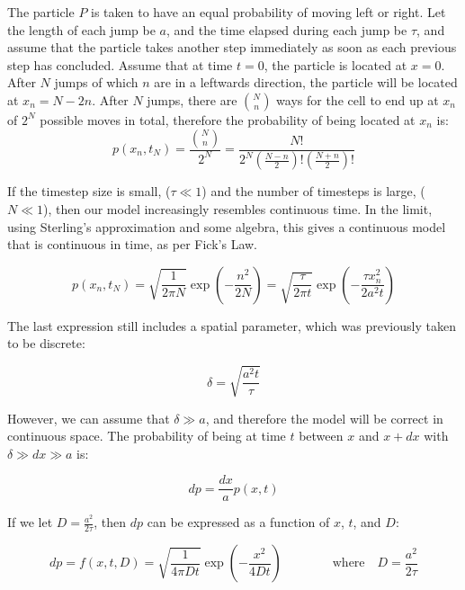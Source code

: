 \documentclass[12pt]{article}
\begin{document}
The particle \(P\) is taken to have an equal probability of 
moving left or right. Let the length of each jump be \(a\), and 
the time elapsed during each jump be \(\tau\), and assume that 
the particle takes another step immediately as soon as each previous 
step has concluded. Assume that at time 
\(t=0\), the particle is located at \(x=0\). After \(N\) jumps of which \(n\) are in a 
leftwards direction, the particle will be located at \(x_n = N-2n\). 
After \(N\) jumps, there are \(\binom{N}{n}\) ways 
for the cell to end up at \(x_n\) of \(2^N\) possible moves in 
total, therefore the probability of being located at \(x_n\) is:
\begin{equation} 
  p(x_n,t_N) = \frac{\binom{N}{n}}{2^N} = \frac{N!}{2^N(\frac{N-n}{2})!(\frac{N+n}{2})!}
\end{equation}

If the timestep size is small, (\(\tau \ll 1\)) and the number of timesteps is large, 
(\(N \ll 1\)), then our model increasingly resembles continuous time. 
In the limit, using Sterling's approximation 
and some algebra, this gives a continuous model that is continuous in 
time, as per Fick's Law.\cite{fick55}

\begin{equation}
  p(x_n,t_N) = \sqrt{\frac{1}{2\pi N}}\exp(-\frac{n^2}{2N}) = \sqrt{\frac{\tau}{2\pi t}}\exp(-\frac{\tau x^2_n}{2a^2t})
\end{equation}

The last expression still includes a spatial parameter, which was 
previously taken to be discrete: 

\begin{equation}
  \delta = \sqrt{\frac{a^2t}{\tau}}
\end{equation}

However, we can assume that \(\delta \gg a\), and therefore the 
model will be correct in continuous space. The probability of being at 
time \(t\) between \(x\) and \(x+dx\) with \(\delta \gg dx \gg a\) is:

\begin{equation}
  dp = \frac{dx}{a}p(x,t)
\end{equation}

If we let \(D = \frac{a^2}{2\tau}\), then \(dp\) can be expressed as a 
function of \(x\), \(t\), and \(D\):

\begin{equation}
  dp = f(x,t,D) = \sqrt{\frac{1}{4\pi Dt}} \exp(-\frac{x^2}{4Dt}) \qquad \qquad \text{where} \quad D = \frac{a^2}{2\tau}
\end{equation}
\end{document}
